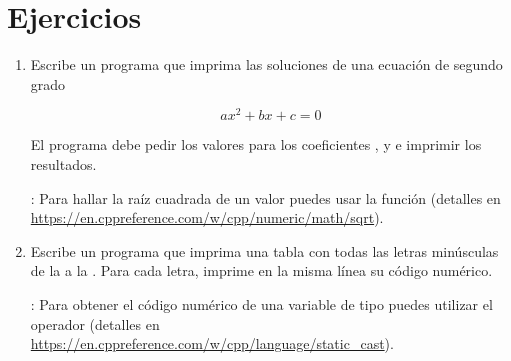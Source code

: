 \section{Ejercicios}

\begin{enumerate}

\item Escribe un programa que imprima las soluciones de una ecuación de segundo grado

\[
a x^2 + b x + c = 0
\]

El programa debe pedir los valores para los coeficientes ,  y
 e imprimir los resultados.

: Para hallar la raíz cuadrada de un valor puedes usar la función
 (detalles en 
\url{https://en.cppreference.com/w/cpp/numeric/math/sqrt}).

\item Escribe un programa que imprima una tabla con todas las letras minúsculas
      de la  a la . Para cada letra, imprime en la misma
      línea su código numérico.

: Para obtener el código numérico de una variable de tipo 
         puedes utilizar el operador 
         (detalles en \url{https://en.cppreference.com/w/cpp/language/static_cast}).

\end{enumerate}
